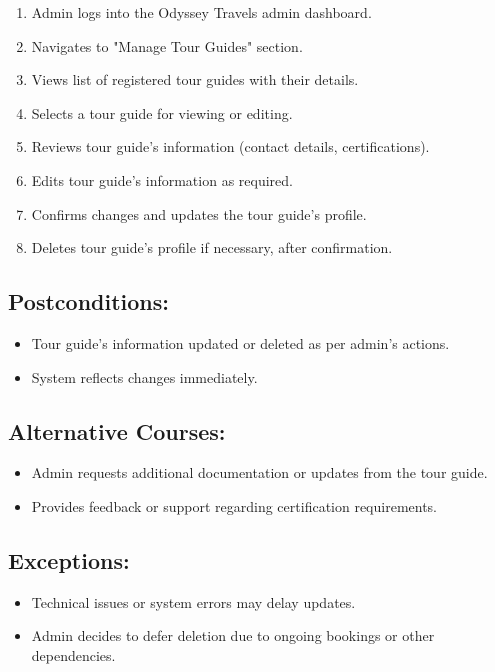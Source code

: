 \documentclass{scrreprt}
\begin{document}
\begin{enumerate}
    \item Admin logs into the Odyssey Travels admin dashboard.
    \item Navigates to "Manage Tour Guides" section.
    \item Views list of registered tour guides with their details.
    \item Selects a tour guide for viewing or editing.
    \item Reviews tour guide's information (contact details, certifications).
    \item Edits tour guide's information as required.
    \item Confirms changes and updates the tour guide's profile.
    \item Deletes tour guide's profile if necessary, after confirmation.
\end{enumerate}

\subsection*{\textbf{Postconditions:}}

\begin{itemize}
    \item Tour guide's information updated or deleted as per admin's actions.
    \item System reflects changes immediately.
\end{itemize}

\subsection*{\textbf{Alternative Courses:}}

\begin{itemize}
    \item Admin requests additional documentation or updates from the tour guide.
    \item Provides feedback or support regarding certification requirements.
\end{itemize}

\subsection*{\textbf{Exceptions:}}

\begin{itemize}
    \item Technical issues or system errors may delay updates.
    \item Admin decides to defer deletion due to ongoing bookings or other dependencies.
\end{itemize}
\end{document}
